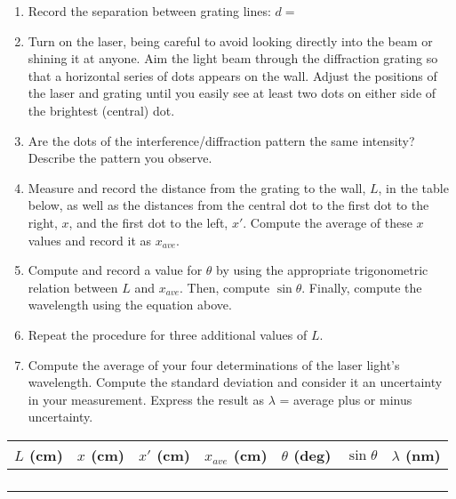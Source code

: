 \begin{enumerate}
\item Record the separation between grating lines: \( d= \)
\item Turn on the laser, being careful to avoid looking directly into the
beam or shining it at anyone. Aim the light beam through the diffraction
grating so that a horizontal series of dots appears on the wall. Adjust
the positions of the laser and grating until you easily see at least
two dots on either side of the brightest (central) dot.
\item Are the dots of the interference/diffraction pattern the same intensity?
Describe the pattern you observe.\vspace{15mm}

\item Measure and record the distance from the grating to the wall, $L$, in 
the table below, as well as the distances from the central dot to the first 
dot to the right, $x$, and the first dot to the left, $x'$. Compute the average
of these $x$ values and record it as $x_{ave}$.
\item Compute and record a value for $\theta$ by using the appropriate 
trigonometric relation between $L$ and $x_{ave}$. Then, compute $\sin \theta$. 
Finally, compute the wavelength using the equation above.
\item Repeat the procedure for three additional values of $L$.
\item Compute the average of your four determinations of the laser light's
wavelength. Compute the standard deviation and consider it an uncertainty in 
your measurement. Express the result as $\lambda$ = average plus or minus 
uncertainty.

\end{enumerate}
\vspace{15mm}
\begin{center}
\begin{tabular}{|c|c|c|c|c|c|c|}
\hline 
\( L \) (cm)&
\( x \) (cm)&
\( x' \) (cm)&
\( x_{ave} \) (cm)&
\( \theta  \) (deg)&
\( \sin \theta  \)&
\( \lambda  \) (nm)\\
\hline
\hline 
&
&
&
&
&
&
\\
\hline 
&
&
&
&
&
&
\\
\hline 
&
&
&
&
&
&
\\
\hline 
&
&
&
&
&
&
\\
\hline
\end{tabular}\vspace{0.3cm}

\end{center}
